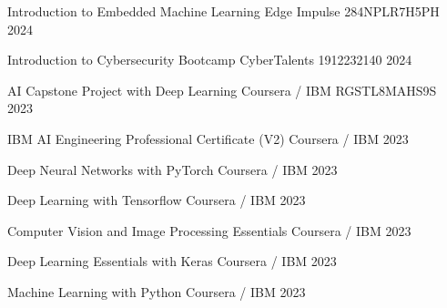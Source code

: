 

\begin{cvhonors}

  \cvhonor
    {Introduction to Embedded Machine Learning} %
    {Edge Impulse} %
    {284NPLR7H5PH} %
    {2024} %

  \cvhonor
    {Introduction to Cybersecurity Bootcamp} %
    {CyberTalents} %
    {1912232140} %
    {2024} %

  \cvhonor
    {AI Capstone Project with Deep Learning} %
    {Coursera / IBM} %
    {RGSTL8MAHS9S} %
    {2023} %

  \cvhonor
    {IBM AI Engineering Professional Certificate (V2)} %
    {Coursera / IBM} %
    {} %
    {2023} %

  \cvhonor
    {Deep Neural Networks with PyTorch} %
    {Coursera / IBM} %
    {} %
    {2023} %

  \cvhonor
    {Deep Learning with Tensorflow} %
    {Coursera / IBM} %
    {} %
    {2023} %

  \cvhonor
    {Computer Vision and Image Processing Essentials} %
    {Coursera / IBM} %
    {} %
    {2023} %

  \cvhonor
    {Deep Learning Essentials with Keras} %
    {Coursera / IBM} %
    {} %
    {2023} %

  \cvhonor
    {Machine Learning with Python} %
    {Coursera / IBM} %
    {} %
    {2023} %


\end{cvhonors}

